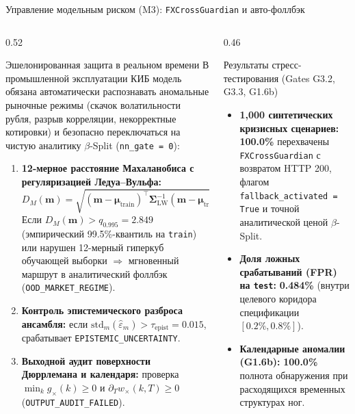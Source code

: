 \documentclass[aspectratio=169, 9pt]{beamer}
\begin{document}
\begin{frame}{Управление модельным риском (M3): \texttt{FXCrossGuardian} и авто-фоллбэк}
  \begin{columns}[T]
    \begin{column}{0.52\textwidth}
      \begin{block}{Эшелонированная защита в реальном времени}
        В промышленной эксплуатации КИБ модель обязана автоматически распознавать аномальные рыночные режимы (скачок волатильности рубля, разрыв корреляции, некорректные котировки) и безопасно переключаться на чистую аналитику $\beta$-Split (\texttt{nn\_gate = 0}):
        \begin{enumerate}
          \item \textbf{12-мерное расстояние Махаланобиса с регуляризацией Ледуа--Вульфа:}
            $$D_M(\bm{m}) = \sqrt{(\bm{m} - \bm{\mu}_{\text{train}})^\top \bm{\Sigma}_{\text{LW}}^{-1} (\bm{m} - \bm{\mu}_{\text{train}})}$$
            Если $D_M(\bm{m}) > q_{0.995} = 2.849$ (эмпирический 99.5\%-квантиль на \texttt{train}) или нарушен 12-мерный гиперкуб обучающей выборки $\Rightarrow$ мгновенный маршрут в аналитический фоллбэк (\texttt{OOD\_MARKET\_REGIME}).
          \item \textbf{Контроль эпистемического разброса ансамбля:}
            если $\text{std}_m(\hat{\varepsilon}_m) > \tau_{\text{epist}} = 0.015$, срабатывает \texttt{EPISTEMIC\_UNCERTAINTY}.
          \item \textbf{Выходной аудит поверхности Дюррлемана и календаря:}
            проверка $\min_k g_\times(k) \ge 0$ и $\partial_T w_\times(k, T) \ge 0$ (\texttt{OUTPUT\_AUDIT\_FAILED}).
        \end{enumerate}
      \end{block}
    \end{column}

    \begin{column}{0.46\textwidth}
      \begin{exampleblock}{Результаты стресс-тестирования (Gates G3.2, G3.3, G1.6b)}
        \begin{itemize}
          \item \textbf{1,000 синтетических кризисных сценариев:} \textbf{100.0\%} перехвачены \texttt{FXCrossGuardian} с возвратом HTTP 200, флагом \texttt{fallback\_activated = True} и точной аналитической ценой $\beta$-Split.
          \item \textbf{Доля ложных срабатываний (FPR) на \texttt{test}:} \textbf{0.484\%} (внутри целевого коридора спецификации $[0.2\%, 0.8\%]$).
          \item \textbf{Календарные аномалии (G1.6b):} \textbf{100.0\%} полнота обнаружения при расходящихся временных структурах ног.
        \end{itemize}
      \end{exampleblock}


\end{column}
\end{columns}
\end{frame}
\end{document}
